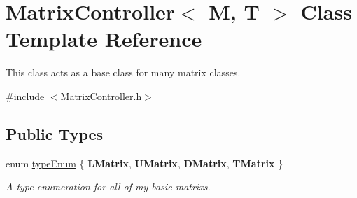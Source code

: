 \hypertarget{class_matrix_controller}{}\section{Matrix\+Controller$<$ M, T $>$ Class Template Reference}
\label{class_matrix_controller}


This class acts as a base class for many matrix classes.  




{\ttfamily \#include $<$Matrix\+Controller.\+h$>$}

\subsection*{Public Types}
\begin{DoxyCompactItemize}
\item 
enum \mbox{\hyperlink{class_matrix_controller_aca66836084cbc7807dbaea879ac31fc7}{type\+Enum}} \{ {\bfseries L\+Matrix}, 
{\bfseries U\+Matrix}, 
{\bfseries D\+Matrix}, 
{\bfseries T\+Matrix}
 \}
\begin{DoxyCompactList}\small\item\em A type enumeration for all of my basic matrixs. \end{DoxyCompactList}\end{DoxyCompactItemize}
